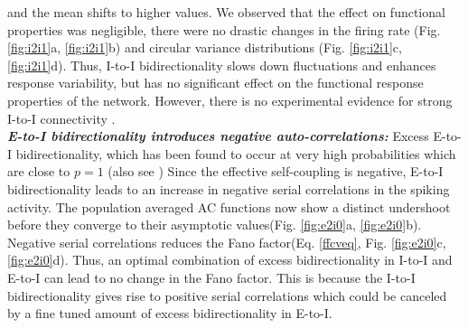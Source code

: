 and the mean shifts to higher values. We observed that the effect on functional properties was negligible, there were no drastic changes in the firing rate (Fig. \ref{fig:i2i1}a, \ref{fig:i2i1}b) and circular variance distributions (Fig. \ref{fig:i2i1}c, \ref{fig:i2i1}d). Thus, I-to-I bidirectionality slows down fluctuations and enhances response variability, but has no significant effect on the functional response properties of the network. However, there is no experimental evidence for strong I-to-I connectivity \cite{Avermann2012}.\\

\emph{\textbf{E-to-I bidirectionality introduces negative auto-correlations:}} Excess E-to-I bidirectionality, which has been found to occur at very high probabilities which are close to $p=1$ \cite{Yoshimura2005, Otsuka2009}(also see \cite{Avermann2012}) %
Since the effective self-coupling is negative, E-to-I bidirectionality leads to an increase in negative serial correlations in the spiking activity. The population averaged AC functions now show a distinct undershoot before they converge to their asymptotic values(Fig. \ref{fig:e2i0}a, \ref{fig:e2i0}b). Negative serial correlations reduces the Fano factor(Eq. \ref{ffcveq}, Fig. \ref{fig:e2i0}c, \ref{fig:e2i0}d). Thus, an optimal combination of excess bidirectionality in I-to-I and E-to-I can lead to no change in the Fano factor. This is because the I-to-I bidirectionality gives rise to positive serial correlations which could be canceled by a fine tuned amount of excess bidirectionality in E-to-I. \\


